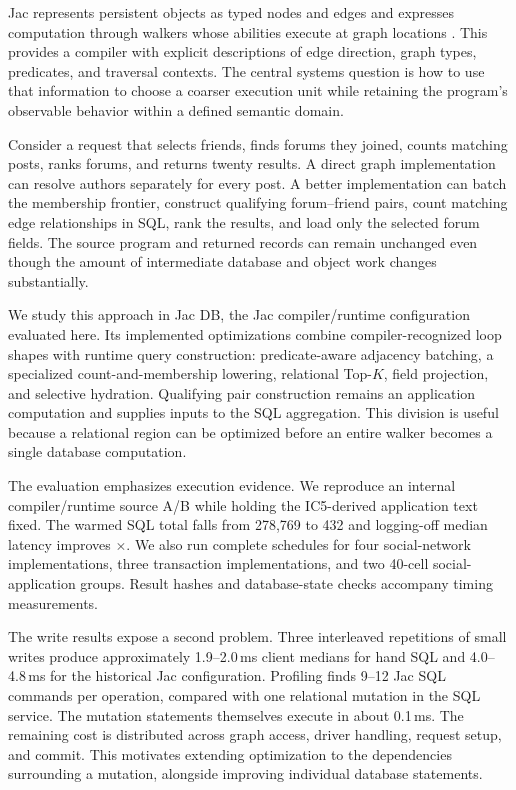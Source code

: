 \documentclass[sigconf,nonacm]{acmart}
\newcommand{\jacdb}{Jac DB}
\begin{document}
Jac represents persistent objects as typed nodes and edges and expresses
computation through walkers whose abilities execute at graph locations
\citep{jacosp}. This provides a compiler with explicit descriptions of edge
direction, graph types, predicates, and traversal contexts. The central systems
question is how to use that information to choose a coarser execution unit
while retaining the program's observable behavior within a defined semantic
domain.

Consider a request that selects friends, finds
forums they joined, counts matching posts, ranks forums, and returns twenty
results. A direct graph implementation can resolve authors separately for
every post. A better implementation can batch the membership frontier,
construct qualifying forum--friend pairs, count matching edge relationships in
SQL, rank the results, and load only the selected forum fields. The source
program and returned records can remain unchanged even though the amount of
intermediate database and object work changes substantially.

We study this approach in \jacdb{}, the Jac compiler/runtime configuration
evaluated here. Its implemented optimizations combine compiler-recognized
loop shapes with runtime query construction: predicate-aware adjacency
batching, a specialized count-and-membership lowering, relational Top-$K$,
field projection, and selective hydration. Qualifying pair construction remains
an application computation and supplies inputs to the SQL aggregation. This
division is useful because a relational region can be optimized before an
entire walker becomes a single database computation.

The evaluation emphasizes execution evidence. We reproduce an internal
compiler/runtime source A/B while holding the IC5-derived application text
fixed. The warmed SQL total falls from 278,769 to 432 and logging-off median
latency improves \LatencySpeedup{}$\times$. We also run complete schedules for
four social-network implementations, three transaction implementations, and
two 40-cell social-application groups. Result hashes and database-state checks
accompany timing measurements.

The write results expose a second problem. Three interleaved repetitions of
small writes produce approximately 1.9--2.0\,ms client medians for hand SQL and
4.0--4.8\,ms for the historical Jac configuration. Profiling finds 9--12 Jac
SQL commands per operation, compared with one relational mutation in the SQL
service. The mutation statements themselves execute in about 0.1\,ms. The
remaining cost is distributed across graph access, driver handling, request
setup, and commit. This motivates extending optimization to the dependencies
surrounding a mutation, alongside improving individual database statements.
\end{document}
